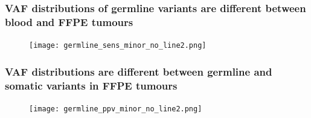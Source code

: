 \documentclass{beamer}
\begin{document}
\begin{frame}
\frametitle{VAF distributions of germline variants are different between blood and FFPE tumours}
\begin{figure}[t]
    \texttt{[image: germline\_sens\_minor\_no\_line2.png]}
\end{figure}
\end{frame}


\begin{frame}
\frametitle{VAF distributions are different between germline and somatic variants in FFPE tumours}
\begin{figure}[t]
    \texttt{[image: germline\_ppv\_minor\_no\_line2.png]}
\end{figure}
\end{frame}
\end{document}
